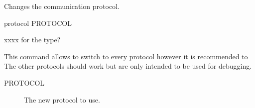
Changes the communication protocol.

\indent protocol PROTOCOL

xxxx  for the type?

This command allows to switch to every protocol however it is recommended to
The other protocols should work but are only intended to be used for
debugging.

\begin{description}
\item[PROTOCOL]
	The new protocol to use.
\end{description}

